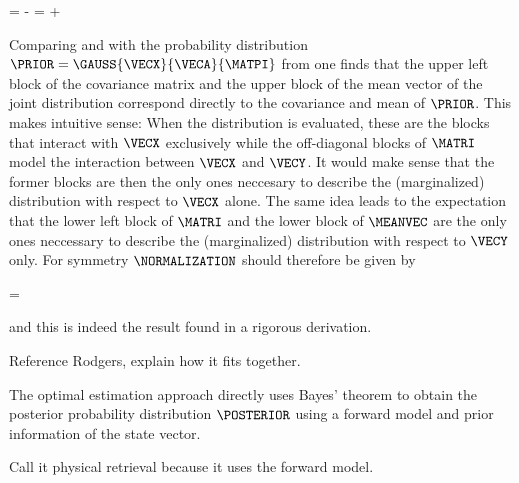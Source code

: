        \placeformula[eq:gaussbayesjointmean]
        \startformula
            \MEANVEC = \MATRI \startpmatrix
                    \MATP \VECA - \MATBT \MATQ \VECB \NR
                    \MATQ \VECB \NR
                \stoppmatrix = \startpmatrix
                    \VECA \NR
                    \MATB \VECA + \VECB \NR
                \stoppmatrix \EQSTOP
        \stopformula

        Comparing  and 
        with the probability distribution $\PRIOR
        = \GAUSS{\VECX}{\VECA}{\MATPI}$ from  one finds
        that the upper left block of the covariance matrix and the upper block
        of the mean vector of the joint distribution correspond directly to the
        covariance and mean of $\PRIOR$. This makes intuitive sense: When the
        distribution is evaluated, these are the blocks that interact with
        $\VECX$ exclusively while the off-diagonal blocks of $\MATRI$ model the
        interaction between $\VECX$ and $\VECY$. It would make sense that the
        former blocks are then the only ones neccesary to describe the
        (marginalized) distribution with respect to $\VECX$ alone. The same
        idea leads to the expectation that the lower left block of $\MATRI$ and
        the lower block of $\MEANVEC$ are the only ones neccessary to describe
        the (marginalized) distribution with respect to $\VECY$ only. For
        symmetry $\NORMALIZATION$ should therefore be given by
        
        \placeformula[eq:gaussbayesnorm]
        \startformula
            \NORMALIZATION = \GAUSS{\VECY}{\MATB \VECA + \VECB}{\MATQI + \MATB \MATP \MATBT} \EQCOMMA
        \stopformula

        and this is indeed the result found in a rigorous derivation.

    \stopsubsection

\stopsection


\startsection[title={Optimal Estimation},reference=ch:optimalestimation]

    Reference Rodgers, explain how it fits together.

    The optimal estimation approach directly uses Bayes' theorem
     to obtain the posterior probability distribution
    $\POSTERIOR$ using a forward model and prior information of the state
    vector.

    Call it physical retrieval because it uses the forward model.

